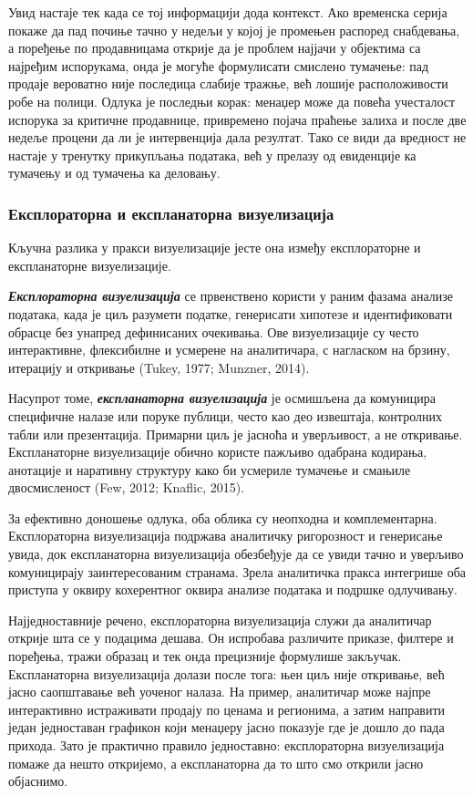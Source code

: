 Увид настаје тек када се тој информацији дода контекст. Ако временска серија покаже да пад почиње тачно у недељи у којој је промењен распоред снабдевања, а поређење по продавницама открије да је проблем најјачи у објектима са најређим испорукама, онда је могуће формулисати смислено тумачење: пад продаје вероватно није последица слабије тражње, већ лошије расположивости робе на полици. Одлука је последњи корак: менаџер може да повећа учесталост испорука за критичне продавнице, привремено појача праћење залиха и после две недеље процени да ли је интервенција дала резултат. Тако се види да вредност не настаје у тренутку прикупљања података, већ у прелазу од евиденције ка тумачењу и од тумачења ка деловању.

\subsubsection{Експлораторна и експланаторна визуелизација}
Кључна разлика у пракси визуелизације јесте она између експлораторне и експланаторне визуелизације. 

\textbf{\textit{Експлораторна визуелизација}} се првенствено користи у раним фазама анализе података, када је циљ разумети податке, генерисати хипотезе и идентификовати обрасце без унапред дефинисаних очекивања. Ове визуелизације су често интерактивне, флексибилне и усмерене на аналитичара, с нагласком на брзину, итерацију и откривање (Tukey, 1977; Munzner, 2014).

Насупрот томе, \textbf{\textit{експланаторна визуелизација}} је осмишљена да комуницира специфичне налазе или поруке публици, често као део извештаја, контролних табли или презентација. Примарни циљ је јасноћа и уверљивост, а не откривање. Експланаторне визуелизације обично користе пажљиво одабрана кодирања, анотације и наративну структуру како би усмериле тумачење и смањиле двосмисленост (Few, 2012; Knaflic, 2015).

За ефективно доношење одлука, оба облика су неопходна и комплементарна. Експлораторна визуелизација подржава аналитичку ригорозност и генерисање увида, док експланаторна визуелизација обезбеђује да се увиди тачно и уверљиво комуницирају заинтересованим странама. Зрела аналитичка пракса интегрише оба приступа у оквиру кохерентног оквира анализе података и подршке одлучивању.

Најједноставније речено, експлораторна визуелизација служи да аналитичар открије шта се у подацима дешава. Он испробава различите приказе, филтере и поређења, тражи образац и тек онда прецизније формулише закључак. Експланаторна визуелизација долази после тога: њен циљ није откривање, већ јасно саопштавање већ уоченог налаза. На пример, аналитичар може најпре интерактивно истраживати продају по ценама и регионима, а затим направити један једноставан графикон који менаџеру јасно показује где је дошло до пада прихода. Зато је практично правило једноставно: експлораторна визуелизација помаже да нешто откријемо, а експланаторна да то што смо открили јасно објаснимо.

